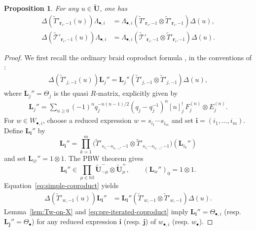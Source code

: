 \documentclass[a4paper,reqno,12pt]{amsart}
\numberwithin{equation}{section}
\newtheorem{proposition}{Proposition}[section]
\theoremstyle{definition}
\theoremstyle{plain}
\theoremstyle{definition}
\def\N{\mathbb N}
\def\I{\mathbb I}
\def \bi{{\mathbf i}}
\def \bj{{\mathbf j}}
\def\bw{w_\bullet}
\def\bwi{w_{\bullet,i}}
\def\br{\mathbf r}
\def\tU{\widetilde{\mathbf U}}
\def\tTD{\widetilde T}
\def\tT{\widetilde{\mathscr T}}
\begin{document}
\begin{proposition}
\label{lem:mixed-coproduct}
For any $u\in\tU$, one has
\begin{align}
\Delta(\tTD'_{\br_i,-1}(u))\Lambda_{\bullet,i}
&=\Lambda_{\bullet,i}
(\tTD'_{\br_i,-1}\otimes\tTD'_{\br_i,-1})\Delta(u),
\label{eq:ordinary-coproduct}\\
\Delta(\tT'_{\br_i,-1}(u))\Lambda_{\bullet,i}
&=\Lambda_{\bullet,i}
(\tT'_{\br_i,-1}\otimes\tTD'_{\br_i,-1})\Delta(u).
\label{eq:mixed-coproduct}
\end{align}
\end{proposition}
\begin{proof}
    We first recall the ordinary braid coproduct formula
\cite[37.3.2]{Lus93}, in the conventions of \cite[(1.2), \S4.4]{WZ23}:
\begin{align}
\Delta(\tTD'_{j,-1}(u))\mathbf L_j''
=\mathbf L_j''(\tTD'_{j,-1}\otimes\tTD'_{j,-1})\Delta(u),
\label{eq:simple-coproduct}
\end{align}
where $\mathbf L_j''=\Theta_j$ is the quasi
$R$-matrix, explicitly given by
\begin{align}
\mathbf L_j''=\sum_{n\geq0}(-1)^nq_j^{-n(n-1)/2}
(q_j-q_j^{-1})^n[n]_j^!\,F_j^{(n)}\otimes E_j^{(n)}.
\label{eq:elementary-R}
\end{align}
For $w\in W_{\bullet,i}$, choose a reduced expression $w=s_{i_1}\cdots s_{i_m}$ and set $\mathbf{i}=(i_1,\ldots,i_m)$. Define $\mathbf L_{\bi}''$ by
\begin{equation}\label{def:R-Product}
  \mathbf L_\bi''=\prod_{k=1}^m \Big(\tTD'_{s_{i_1}\cdots s_{i_{k-1}},-1}\otimes\tTD'_{s_{i_1}\cdots s_{i_{k-1}},-1}\Big)(\mathbf L_{i_k}'')  
\end{equation}
and set $\mathbf L_\varnothing''=1\otimes1$. The PBW theorem gives
\begin{equation*}
    \mathbf L_\bi''\in\prod_{\mu\in\N\I}\tU^-_{-\mu}\otimes\tU^+_{\mu},\qquad (\mathbf L_w'')_0=1\otimes1.
\end{equation*}
Equation~\eqref{eq:simple-coproduct} yields
\begin{align}
    \Delta(\tTD'_{w,-1}(u))\mathbf L_\bi''
&=\mathbf L_\bi''(\tTD'_{w,-1}\otimes\tTD'_{w,-1})\Delta(u).
\label{eq:pre-iterated-coproduct}
\end{align}
Lemma~\ref{lem:Tw-on-X} and \eqref{eq:pre-iterated-coproduct} imply $\mathbf L_{\bi}''=\Theta_{\bullet,i}$ (resp. $\mathbf L_{\bj}''=\Theta_\bullet$) for any reduced expression $\bi$ (resp. $\bj$) of $\bwi$ (resp. $\bw$).


\end{proof}
\end{document}

